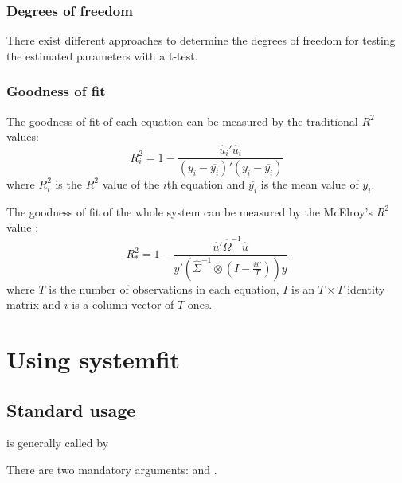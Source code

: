 \documentclass[article]{jss}
\begin{document}
\subsubsection{Degrees of freedom}

There exist different approaches to determine the degrees of
freedom for testing the estimated parameters with a t-test.


\subsubsection{Goodness of fit}

The goodness of fit of each equation can be measured by the 
traditional $R^2$ values:
\begin{equation}
   R_i^2 = 1 - \frac{ \widehat{u}_i' \widehat{u}_i }
   { ( y_i - \overline{y_i} )' ( y_i - \overline{y_i} ) }
\end{equation}
where $R_i^2$ is the $R^2$ value of the $i$th equation
and $\overline{y_i}$ is the mean value of $y_i$.

The goodness of fit of the whole system can be measured by the
McElroy's $R^2$ value \citep{mcelroy77}: 
\begin{equation}
   R_*^2 = 1 - \frac{ \widehat{u}' \widehat{ \Omega }^{-1} \widehat{u} }
   { y' \left( \widehat{ \Sigma }^{-1} \otimes
   \left( I - \frac{i i'}{T} \right) \right) y }
\end{equation}
where $T$ is the number of observations in each equation,
$I$ is an $T \times T$ identity matrix and 
$i$ is a column vector of $T$ ones.


\section{Using systemfit}\label{sec:UsingSystemfit}


\subsection{Standard usage}

 is generally called by


There are two mandatory arguments:  and .
\end{document}
